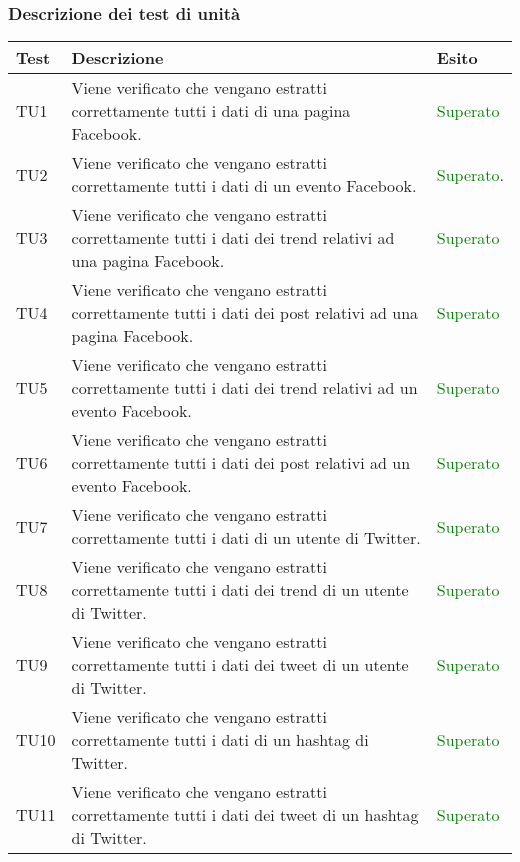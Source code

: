 		\subsubsection{Descrizione dei test di unità}
			\begin{center}

			\def\arraystretch{1.5}
			\bgroup
			\begin{longtable}{| p{2cm} | p{8cm} | p{2.5cm} |}
					\hline
					\textbf{Test} & \textbf{Descrizione} & \textbf{Esito}\\
					\hline						
					TU1 & Viene verificato che vengano estratti correttamente tutti i dati di una pagina Facebook. & \textcolor{green}{Superato}\\
					\hline
					TU2 & Viene verificato che vengano estratti correttamente tutti i dati di un evento Facebook. & \textcolor{green}{Superato}.\\
					\hline
					TU3 & Viene verificato che vengano estratti correttamente tutti i dati dei trend relativi ad una pagina Facebook. & \textcolor{green}{Superato}\\
					\hline
					TU4 & Viene verificato che vengano estratti correttamente tutti i dati dei post relativi ad una pagina Facebook. & \textcolor{green}{Superato}\\
					\hline
					TU5 & Viene verificato che vengano estratti correttamente tutti i dati dei trend relativi ad un evento Facebook. & \textcolor{green}{Superato}\\
					\hline
					TU6 & Viene verificato che vengano estratti correttamente tutti i dati dei post relativi ad un evento Facebook. & \textcolor{green}{Superato}\\
					\hline
					TU7 & Viene verificato che vengano estratti correttamente tutti i dati di un utente di Twitter. & \textcolor{green}{Superato}\\
					\hline
					TU8 & Viene verificato che vengano estratti correttamente tutti i dati dei trend di un utente di Twitter. & \textcolor{green}{Superato}\\
					\hline
					TU9 & Viene verificato che vengano estratti correttamente tutti i dati dei tweet di un utente di Twitter. & \textcolor{green}{Superato}\\
					\hline
					TU10 & Viene verificato che vengano estratti correttamente tutti i dati di un hashtag di Twitter. & \textcolor{green}{Superato}\\
					\hline
					TU11 & Viene verificato che vengano estratti correttamente tutti i dati dei tweet di un hashtag di Twitter. & \textcolor{green}{Superato}\\

\end{longtable}
\end{center}
